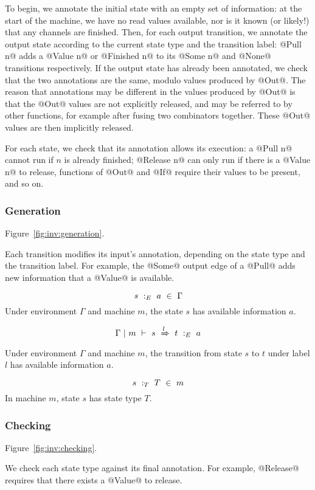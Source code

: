 To begin, we annotate the initial state with an empty set of information: at the start of the machine, we have no read values available, nor is it known (or likely!) that any channels are finished.
Then, for each output transition, we annotate the output state according to the current state type and the transition label: @Pull n@ adds a @Value n@ or @Finished n@ to its @Some n@ and @None@ transitions respectively.
If the output state has already been annotated, we check that the two annotations are the same, modulo values produced by @Out@.
The reason that annotations may be different in the values produced by @Out@ is that the @Out@ values are not explicitly released, and may be referred to by other functions, for example after fusing two combinators together.
These @Out@ values are then implicitly released.

For each state, we check that its annotation allows its execution: a @Pull n@ cannot run if $n$ is already finished; @Release n@ can only run if there is a @Value n@ to release, functions of @Out@ and @If@ require their values to be present, and so on.



\subsubsection{Generation}
Figure~\ref{fig:inv:generation}.

Each transition modifies its input's annotation, depending on the state type and the transition label.
For example, the @Some@ output edge of a @Pull@ adds new information that a @Value@ is available.

$$ s~:_E~ a ~\in~ \Gamma $$
Under environment $\Gamma$ and machine $m$, the state $s$ has available information $a$.

$$ \Gamma ~|~ m ~\vdash~ s~\xRightarrow{l}~t ~:_E~ a $$
Under environment $\Gamma$ and machine $m$, the transition from state $s$ to $t$ under label $l$ has available information $a$.

$$ s ~:_T~ T ~\in~m $$
In machine $m$, state $s$ has state type $T$.


\subsubsection{Checking}
Figure~\ref{fig:inv:checking}.

We check each state type against its final annotation. For example, @Release@ requires that there exists a @Value@ to release.

